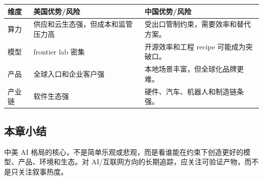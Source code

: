 \noindent\begin{tabularx}{\textwidth}{p{}p{}X}
\toprule
维度 & 美国优势/风险 & 中国优势/风险 \\
\midrule
算力 & 供应和云生态强，但成本和监管压力高 & 受出口管制约束，需要效率和替代方案。 \\
模型 & frontier lab 密集 & 开源效率和工程 recipe 可能成为突破口。 \\
产品 & 全球入口和企业客户强 & 本地场景丰富，但全球化品牌更难。 \\
产业链 & 软件生态强 & 硬件、汽车、机器人和制造链条强。 \\
\bottomrule
\end{tabularx}

\subsection{本章小结}

中美 AI 格局的核心，不是简单乐观或悲观，而是看谁能在约束下创造更好的模型、产品、环境和生态。对 AI/互联网方向的长期追踪，应关注可验证产物，而不是只关注叙事热度。

